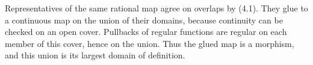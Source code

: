 Representatives of the same rational map agree on overlaps by (4.1). They glue to a continuous map on the union of their domains, because continuity can be checked on an open cover. Pullbacks of regular functions are regular on each member of this cover, hence on the union. Thus the glued map is a morphism, and this union is its largest domain of definition.
